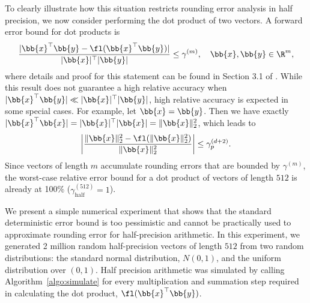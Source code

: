 To clearly illustrate how this situation restricts rounding error analysis in half precision, we now consider performing the dot product of two vectors.
A forward error bound for dot products is
\begin{equation}
\frac{|\bb{x}^{\top}\bb{y} - \fl(\bb{x}^{\top}\bb{y})|}{|\bb{x}|^{\top}|\bb{y}|} \leq \gamma^{(m)}, \quad \bb{x},\bb{y}\in\R^{m},
\label{eqn:DDerr}
\end{equation}
where details and proof for this statement can be found in Section 3.1 of \cite{Higham2002}.
While this result does not guarantee a high relative accuracy when $|\bb{x}^{\top}\bb{y}| \ll |\bb{x}|^{\top}|\bb{y}|$, high relative accuracy is expected in some special cases.
For example, let $\bb{x}=\bb{y}$.
Then we have exactly $|\bb{x}^{\top}\bb{x}| = |\bb{x}|^{\top}|\bb{x}|=\|\bb{x}\|_2^2$, which leads to
\begin{equation}
\left|\frac{\|\bb{x}\|_2^2 - \fl(\|\bb{x}\|_2^2)}{\|\bb{x}\|_2^2}\right| \leq \gamma_p^{(d+2)}.
\end{equation}
Since vectors of length $m$ accumulate rounding errors that are bounded by $\gamma^{(m)}$, the worst-case relative error bound for a dot product of vectors of length $512$ is already at 100\% ($\gamma_{\text{half}}^{(512)}=1$). \par

We present a simple numerical experiment that shows that the standard deterministic error bound is too pessimistic and cannot be practically used to approximate rounding error for half-precision arithmetic. 
In this experiment, we generated 2 million random half-precision vectors of length $512$ from two random distributions: the standard normal distribution, $N(0,1)$, and the uniform distribution over $(0,1)$.
Half precision arithmetic was simulated by calling Algorithm~\ref{algo:simulate} for every multiplication and summation step required in calculating the dot product, $\fl(\bb{x}^{\top}\bb{y})$.


